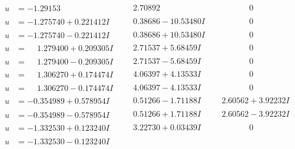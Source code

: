 \documentclass[1p]{elsarticle_modified}
\theoremstyle{definition}
\begin{document}
$$\begin{array}{c|c|c}
 \hline 
\begin{aligned}
u &= -1.29153\phantom{ +0.000000I}\end{aligned}
 & \phantom{-}2.70892\phantom{ +0.000000I} & \phantom{-0.000000 } 0 \\ \hline\begin{aligned}
u &= -1.275740 + 0.221412 I\end{aligned}
 & \phantom{-}0.38686 - 10.53480 I & \phantom{-0.000000 } 0 \\ \hline\begin{aligned}
u &= -1.275740 - 0.221412 I\end{aligned}
 & \phantom{-}0.38686 + 10.53480 I & \phantom{-0.000000 } 0 \\ \hline\begin{aligned}
u &= \phantom{-}1.279400 + 0.209305 I\end{aligned}
 & \phantom{-}2.71537 + 5.68459 I & \phantom{-0.000000 } 0 \\ \hline\begin{aligned}
u &= \phantom{-}1.279400 - 0.209305 I\end{aligned}
 & \phantom{-}2.71537 - 5.68459 I & \phantom{-0.000000 } 0 \\ \hline\begin{aligned}
u &= \phantom{-}1.306270 + 0.174474 I\end{aligned}
 & \phantom{-}4.06397 + 4.13533 I & \phantom{-0.000000 } 0 \\ \hline\begin{aligned}
u &= \phantom{-}1.306270 - 0.174474 I\end{aligned}
 & \phantom{-}4.06397 - 4.13533 I & \phantom{-0.000000 } 0 \\ \hline\begin{aligned}
u &= -0.354989 + 0.578954 I\end{aligned}
 & \phantom{-}0.51266 - 1.71188 I & \phantom{-}2.60562 + 3.92232 I \\ \hline\begin{aligned}
u &= -0.354989 - 0.578954 I\end{aligned}
 & \phantom{-}0.51266 + 1.71188 I & \phantom{-}2.60562 - 3.92232 I \\ \hline\begin{aligned}
u &= -1.332530 + 0.123240 I\end{aligned}
 & \phantom{-}3.22730 + 0.03439 I & \phantom{-0.000000 } 0 \\ \hline\begin{aligned}
u &= -1.332530 - 0.123240 I\end{aligned}

\end{array}$$
\end{document}
